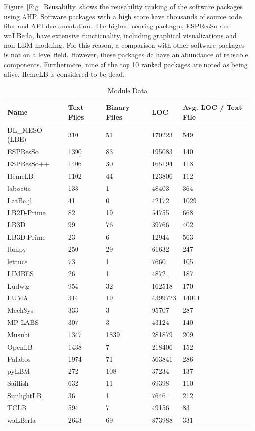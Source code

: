 \documentclass[final, 3p, times, authoryear]{elsarticle}
\begin{document}
Figure~\ref{Fig_Reusabilty} shows the reusability ranking of the software
packages using AHP. Software packages with a high score have thousands of source
code files and API documentation. The highest scoring packages, ESPResSo and
waLBerla, have extensive functionality, including graphical visualizations and
non-LBM modeling. For this reason, a comparison with other software packages is
not on a level field. However, these packages do have an abundance of reusable
components. Furthermore, nine of the top 10 ranked packages are noted as being
alive. HemeLB is considered to be dead.

\begin{table}
	\begin{center}
		\begin{tabular}{ p{3.5cm}p{2cm}p{2.5cm}p{2cm}p{2.5cm} }
			\hline
			Name & Text Files & Binary Files & LOC & Avg. LOC / Text File\\
			\hline
			DL\_MESO (LBE) & 310 & 51 & 170223 & 549\\
			ESPResSo & 1390& 83 & 195083 & 140\\
			ESPResSo++ & 1406& 30 & 165194 & 118\\
			HemeLB & 1102& 44 & 123806 & 112\\
			laboetie & 133& 1 & 48403 & 364\\		
			LatBo.jl & 41& 0 & 42172 & 1029\\
			LB2D-Prime & 82& 19 & 54755 & 668\\
			LB3D & 99 & 76 & 39766 & 402\\
			LB3D-Prime & 23& 6 & 12944 & 563\\
			lbmpy& 250 & 29 & 61632 & 247\\
			lettuce & 73 & 1 & 7660 & 105\\
			LIMBES & 26 & 1 & 4872 & 187\\
			Ludwig & 954 & 32 & 162518 & 170\\
			LUMA & 314 & 19 & 4399723 & 14011\\
			MechSys & 333 & 3 & 95707 & 287\\
			MP-LABS & 307 & 3 & 43124 & 140\\
			Musubi & 1347 & 1839 & 281879 & 209\\
			OpenLB & 1438 & 7 & 218406 & 152\\
			Palabos & 1974 & 71 & 563841 & 286\\
			pyLBM & 272 & 108 & 37234 & 137\\
			Sailfish & 632 & 11 & 69398 & 110\\
			SunlightLB & 36 & 1 & 7646 & 212\\
			TCLB & 594 & 7 & 49156 & 83\\
			waLBerla & 2643 & 69 & 873988 & 331\\
			\hline
		\end{tabular}
		\caption{Module Data} \label{moduledata}
	\end{center}
\end{table}
\end{document}
